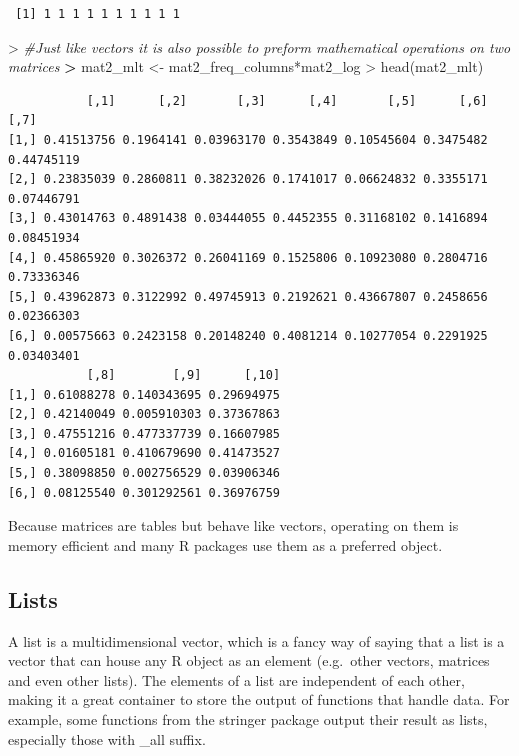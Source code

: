 \documentclass[
]{book}
\newenvironment{Shaded}{\begin{snugshade}}{\end{snugshade}}
\newcommand{\CommentTok}[1]{\textcolor[rgb]{0.56,0.35,0.01}{\textit{#1}}}
\newcommand{\ErrorTok}[1]{\textcolor[rgb]{0.64,0.00,0.00}{\textbf{#1}}}
\newcommand{\FunctionTok}[1]{\textcolor[rgb]{0.00,0.00,0.00}{#1}}
\newcommand{\NormalTok}[1]{#1}
\newcommand{\OtherTok}[1]{\textcolor[rgb]{0.56,0.35,0.01}{#1}}
\newcommand{\SpecialCharTok}[1]{\textcolor[rgb]{0.00,0.00,0.00}{#1}}
\theoremstyle{definition}
\theoremstyle{definition}
\theoremstyle{definition}
\theoremstyle{definition}
\theoremstyle{remark}
\begin{document}
\begin{verbatim}
 [1] 1 1 1 1 1 1 1 1 1 1
\end{verbatim}

\begin{Shaded}
\begin{Highlighting}[]
\SpecialCharTok{\textgreater{}} \CommentTok{\#Just like vectors it is also possible to preform mathematical operations on two matrices}
\ErrorTok{\textgreater{}}\NormalTok{ mat2\_mlt }\OtherTok{\textless{}{-}}\NormalTok{ mat2\_freq\_columns}\SpecialCharTok{*}\NormalTok{mat2\_log}
\SpecialCharTok{\textgreater{}} \FunctionTok{head}\NormalTok{(mat2\_mlt)}
\end{Highlighting}
\end{Shaded}

\begin{verbatim}
           [,1]      [,2]       [,3]      [,4]       [,5]      [,6]       [,7]
[1,] 0.41513756 0.1964141 0.03963170 0.3543849 0.10545604 0.3475482 0.44745119
[2,] 0.23835039 0.2860811 0.38232026 0.1741017 0.06624832 0.3355171 0.07446791
[3,] 0.43014763 0.4891438 0.03444055 0.4452355 0.31168102 0.1416894 0.08451934
[4,] 0.45865920 0.3026372 0.26041169 0.1525806 0.10923080 0.2804716 0.73336346
[5,] 0.43962873 0.3122992 0.49745913 0.2192621 0.43667807 0.2458656 0.02366303
[6,] 0.00575663 0.2423158 0.20148240 0.4081214 0.10277054 0.2291925 0.03403401
           [,8]        [,9]      [,10]
[1,] 0.61088278 0.140343695 0.29694975
[2,] 0.42140049 0.005910303 0.37367863
[3,] 0.47551216 0.477337739 0.16607985
[4,] 0.01605181 0.410679690 0.41473527
[5,] 0.38098850 0.002756529 0.03906346
[6,] 0.08125540 0.301292561 0.36976759
\end{verbatim}

Because matrices are tables but behave like vectors, operating on them is memory efficient and many R packages use
them as a preferred object.

\hypertarget{lists}{%
\subsection*{\texorpdfstring{\textbf{Lists}}{Lists}}\label{lists}}

A list is a multidimensional vector, which is a fancy way of saying that a list is a vector that can house any R
object as an element (e.g.~other vectors, matrices and even other lists).
The elements of a list are independent of each other, making it a great container to store the output of functions that
handle data. For example, some functions from the stringer package output their result as lists, especially those with
\_all suffix.
\end{document}
